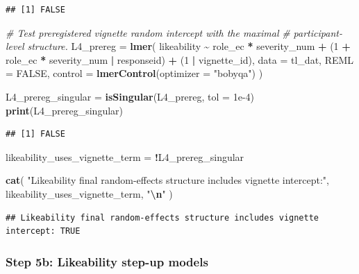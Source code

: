 \documentclass[
]{article}
\newenvironment{Shaded}{\begin{snugshade}}{\end{snugshade}}
\newcommand{\AttributeTok}[1]{\textcolor[rgb]{0.13,0.29,0.53}{#1}}
\newcommand{\CommentTok}[1]{\textcolor[rgb]{0.56,0.35,0.01}{\textit{#1}}}
\newcommand{\ConstantTok}[1]{\textcolor[rgb]{0.56,0.35,0.01}{#1}}
\newcommand{\DecValTok}[1]{\textcolor[rgb]{0.00,0.00,0.81}{#1}}
\newcommand{\FloatTok}[1]{\textcolor[rgb]{0.00,0.00,0.81}{#1}}
\newcommand{\FunctionTok}[1]{\textcolor[rgb]{0.13,0.29,0.53}{\textbf{#1}}}
\newcommand{\NormalTok}[1]{#1}
\newcommand{\OtherTok}[1]{\textcolor[rgb]{0.56,0.35,0.01}{#1}}
\newcommand{\SpecialCharTok}[1]{\textcolor[rgb]{0.81,0.36,0.00}{\textbf{#1}}}
\newcommand{\StringTok}[1]{\textcolor[rgb]{0.31,0.60,0.02}{#1}}
\begin{document}
\begin{verbatim}
## [1] FALSE
\end{verbatim}

\begin{Shaded}
\begin{Highlighting}[]
\CommentTok{\# Test preregistered vignette random intercept with the maximal}
\CommentTok{\# participant{-}level structure.}
\NormalTok{L4\_prereg }\OtherTok{=} \FunctionTok{lmer}\NormalTok{(}
\NormalTok{  likeability }\SpecialCharTok{\textasciitilde{}}\NormalTok{ role\_ec }\SpecialCharTok{*}\NormalTok{ severity\_num }\SpecialCharTok{+}
\NormalTok{    (}\DecValTok{1} \SpecialCharTok{+}\NormalTok{ role\_ec }\SpecialCharTok{*}\NormalTok{ severity\_num }\SpecialCharTok{|}\NormalTok{ responseid) }\SpecialCharTok{+}
\NormalTok{    (}\DecValTok{1} \SpecialCharTok{|}\NormalTok{ vignette\_id),}
  \AttributeTok{data =}\NormalTok{ tl\_dat,}
  \AttributeTok{REML =} \ConstantTok{FALSE}\NormalTok{,}
  \AttributeTok{control =} \FunctionTok{lmerControl}\NormalTok{(}\AttributeTok{optimizer =} \StringTok{"bobyqa"}\NormalTok{)}
\NormalTok{)}

\NormalTok{L4\_prereg\_singular }\OtherTok{=} \FunctionTok{isSingular}\NormalTok{(L4\_prereg, }\AttributeTok{tol =} \FloatTok{1e{-}4}\NormalTok{)}
\FunctionTok{print}\NormalTok{(L4\_prereg\_singular)}
\end{Highlighting}
\end{Shaded}

\begin{verbatim}
## [1] FALSE
\end{verbatim}

\begin{Shaded}
\begin{Highlighting}[]
\NormalTok{likeability\_uses\_vignette\_term }\OtherTok{=} \SpecialCharTok{!}\NormalTok{L4\_prereg\_singular}

\FunctionTok{cat}\NormalTok{(}
  \StringTok{"Likeability final random{-}effects structure includes vignette intercept:"}\NormalTok{,}
\NormalTok{  likeability\_uses\_vignette\_term,}
  \StringTok{"}\SpecialCharTok{\textbackslash{}n}\StringTok{"}
\NormalTok{)}
\end{Highlighting}
\end{Shaded}

\begin{verbatim}
## Likeability final random-effects structure includes vignette intercept: TRUE
\end{verbatim}

\subsubsection{Step 5b: Likeability step-up
models}\label{step-5b-likeability-step-up-models}
\end{document}
